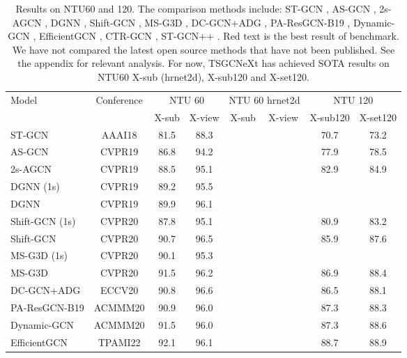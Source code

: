 \documentclass[10pt,twocolumn,letterpaper]{article}
\begin{document}
\begin{table*}[htbp]
\begin{tabular}{l|c|cc|cc}
    \end{tabular}\label{tab:bs}\end{table*} \begin{table*}
\centering
  \caption{Results on NTU60 and 120. The comparison methods include: ST-GCN \cite{yan2018spatial}, AS-GCN \cite{li2019actional}, 2s-AGCN \cite{shi2019two}, DGNN \cite{shi2019skeleton}, Shift-GCN \cite{cheng2020skeleton}, MS-G3D \cite{liu2020disentangling}, DC-GCN+ADG \cite{cheng2020decoupling}, PA-ResGCN-B19 \cite{song2020stronger}, Dynamic-GCN \cite{ye2020dynamic}, EfficientGCN \cite{song2022constructing}, CTR-GCN \cite{chen2021channel}, ST-GCN++ \cite{duan2021revisiting}. Red text is the best result of benchmark. We have not compared the latest open source methods that have not been published. See the appendix for relevant analysis. For now, TSGCNeXt has achieved SOTA results on NTU60 X-sub (hrnet2d), X-sub120 and X-set120.}
  \label{tab:allresult}
    \begin{tabular}{lc|cc|cc|cc}
    \toprule
    \multirow{2}[0]{*}{Model} & \multirow{2}[0]{*}{Conference} & \multicolumn{2}{c}{NTU 60} & \multicolumn{2}{c}{NTU 60 hrnet2d} & \multicolumn{2}{c}{NTU 120} \\
          &       & X-sub & X-view & X-sub & X-view & X-sub120 & X-set120 \\
    \midrule
ST-GCN & AAAI18 & 81.5  & 88.3  &  &  & 70.7  & 73.2 \\
    AS-GCN & CVPR19 & 86.8  & 94.2  &  &  & 77.9  & 78.5 \\
    2s-AGCN & CVPR19 & 88.5  & 95.1  &  &  & 82.9  & 84.9 \\
    DGNN (1s)  & CVPR19 & 89.2  & 95.5  &  &  &  &  \\
    DGNN  & CVPR19 & 89.9  & 96.1  &  &  &  &  \\
    Shift-GCN (1s) & CVPR20 & 87.8  & 95.1  &  &  & 80.9  & 83.2  \\
    Shift-GCN & CVPR20 & 90.7  & 96.5  &  &  & 85.9  & 87.6 \\
    MS-G3D (1s) & CVPR20 & 90.1  & 95.3  &  &  &  &  \\
    MS-G3D & CVPR20 & 91.5  & 96.2  &  &  & 86.9  & 88.4 \\
    DC-GCN+ADG & ECCV20 & 90.8  & 96.6  &  &  & 86.5  & 88.1 \\
    PA-ResGCN-B19 & ACMMM20 & 90.9  & 96.0   &  &  & 87.3  & 88.3 \\
    Dynamic-GCN & ACMMM20 & 91.5  & 96.0   &  &  & 87.3  & 88.6 \\
    EfficientGCN & TPAMI22 & 92.1  & 96.1  &  &  & 88.7  & 88.9 \\

\end{tabular}
\end{table*}
\end{document}
